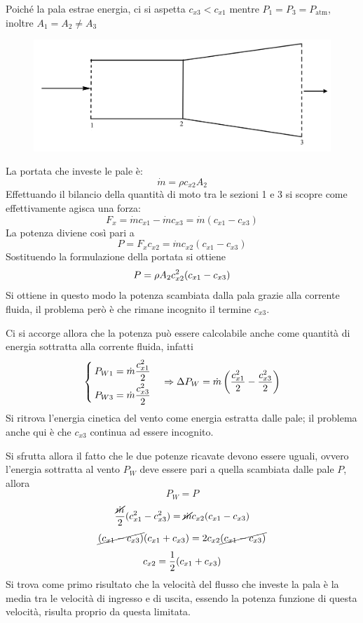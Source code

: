 \documentclass[a4paper, 15pt]{article}
\begin{document}
\begin{adjustwidth}{2in}{}
	Poiché la pala estrae energia, ci si aspetta $c_{x3}<c_{x1}$ mentre $P_1=P_3=P_{\text{atm}}$, inoltre $A_1=A_2\ne A_3$
	\begin{figure}[H]
		\centering
		\includegraphics[width=0.5\linewidth]{immagini/eoliche15}
		\label{fig:eoliche15}
	\end{figure}
	La portata che investe le pale è: 
	\[\dot{m} = \rho c_{x2}A_2\]
	Effettuando il bilancio della quantità di moto tra le sezioni 1 e 3 si scopre come effettivamente agisca una forza: 
	\[F_x = \dot{m}c_{x1} - \dot{m}c_{x3} = \dot{m}(c_{x1}-c_{x3})\]
	La potenza diviene così pari a 
	\[P = F_xc_{x2} = \dot{m}c_{x2}(c_{x1}-c_{x3})\]
	Sostituendo la formulazione della portata si ottiene 
	\begin{equation}{\label{eq:8}}
		P = \rho A_2c^2_{x2}(c_{x1}-c_{x3})
	\end{equation}
	Si ottiene in questo modo la potenza scambiata dalla pala grazie alla corrente fluida, il problema però è che rimane incognito il termine $c_{x3}$. \newline 
	
	Ci si accorge allora che la potenza può essere calcolabile anche come quantità di energia sottratta alla corrente fluida, infatti
	\[\begin{cases}
	\begin{aligned}
			P_{W1} &= \dot{m}{c_{x1}^2\over2} \\
		P_{W3} &= \dot{m}{c_{x3}^2\over2}	
	\end{aligned}
	\end{cases}\Rightarrow \Delta P_{W} = \dot{m}\left({c_{x1}^2\over2}-{c_{x3}^2\over2}\right)\]
	Si ritrova l'energia cinetica del vento come energia estratta dalle pale; il problema anche qui  è che $c_{x3}$ continua ad essere incognito.  \newline 
	
	Si sfrutta allora il fatto che le due potenze ricavate devono essere uguali, ovvero l'energia sottratta al vento $P_W$ deve essere pari a quella scambiata dalle pale $P$, allora
	\[P_W = P\]
	\[{\cancel{\dot{m}}\over2}(c_{x1}^2-c_{x3}^2) = \cancel{\dot{m}}c_{x2}(c_{x1}-c_{x3})\]
	\[\cancel{(c_{x1}-c_{x3})}(c_{x1}+c_{x3}) = 2c_{x2}\cancel{(c_{x1}-c_{x3})} \]
	\[c_{x2} = {1\over2}(c_{x1}+c_{x3})\]
	Si trova come primo risultato che la velocità del flusso che investe la pala è la media tra le velocità di ingresso e di uscita, essendo la potenza funzione di questa velocità, risulta proprio da questa limitata. 
	

\end{adjustwidth}
\end{document}
